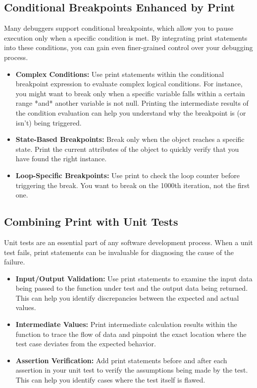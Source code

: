 \documentclass{article}
\begin{document}
{{{{\subsection*{Conditional Breakpoints Enhanced by Print}

Many debuggers support conditional breakpoints, which allow you to pause execution only when a specific condition is met. By integrating print statements into these conditions, you can gain even finer-grained control over your debugging process.

\begin{itemize}
    \item \textbf{Complex Conditions:} Use print statements within the conditional breakpoint expression to evaluate complex logical conditions. For instance, you might want to break only when a specific variable falls within a certain range *and* another variable is not null. Printing the intermediate results of the condition evaluation can help you understand why the breakpoint is (or isn't) being triggered.

    \item \textbf{State-Based Breakpoints:} Break only when the object reaches a specific state. Print the current attributes of the object to quickly verify that you have found the right instance.

    \item \textbf{Loop-Specific Breakpoints:} Use print to check the loop counter before triggering the break. You want to break on the 1000th iteration, not the first one.
\end{itemize}

\subsection*{Combining Print with Unit Tests}

Unit tests are an essential part of any software development process. When a unit test fails, print statements can be invaluable for diagnosing the cause of the failure.

\begin{itemize}
    \item \textbf{Input/Output Validation:} Use print statements to examine the input data being passed to the function under test and the output data being returned. This can help you identify discrepancies between the expected and actual values.
    \item \textbf{Intermediate Values:} Print intermediate calculation results within the function to trace the flow of data and pinpoint the exact location where the test case deviates from the expected behavior.
    \item \textbf{Assertion Verification:} Add print statements before and after each assertion in your unit test to verify the assumptions being made by the test. This can help you identify cases where the test itself is flawed.
\end{itemize}

}}}}
\end{document}
